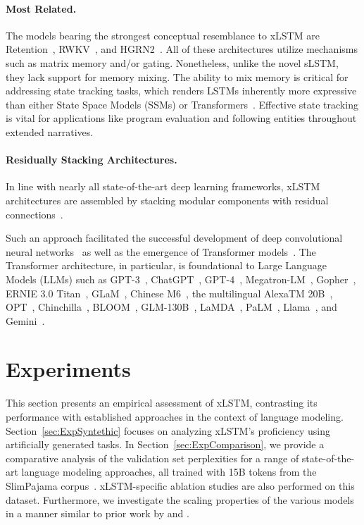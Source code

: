 \paragraph{Most Related.} The models bearing the strongest conceptual resemblance to xLSTM are Retention~\citep{Sun:23arxiv}, RWKV~\citep{Peng:23arxivshort,Peng:24arxivshort}, and HGRN2~\citep{Qin:24arxiv}. All of these architectures utilize mechanisms such as matrix memory and/or gating. Nonetheless, unlike the novel sLSTM, they lack support for memory mixing. The ability to mix memory is critical for addressing state tracking tasks, which renders LSTMs inherently more expressive than either State Space Models (SSMs) or Transformers~\citep{Merrill:24,Deletang:23}. Effective state tracking is vital for applications like program evaluation and following entities throughout extended narratives.

\paragraph{Residually Stacking Architectures.} In line with nearly all state-of-the-art deep learning frameworks, xLSTM architectures are assembled by stacking modular components with residual connections~\citep{Srivastava:15,He:16}.

Such an approach facilitated the successful development of deep convolutional neural networks~\citep{He:16} as well as the emergence of Transformer models~\citep{Vaswani:17}. The Transformer architecture, in particular, is foundational to Large Language Models (LLMs) such as GPT-3~\citep{Brown:20short}, ChatGPT~\citep{Schulman:22short}, GPT-4~\citep{Achiam:23gpt4short}, Megatron-LM~\citep{Shoeybi:19}, Gopher~\citep{Rae:21short}, ERNIE 3.0 Titan~\citep{Wang:21arxivshort}, GLaM~\citep{Du:21glamshort}, Chinese M6~\citep{Lin:21}, the multilingual AlexaTM 20B~\citep{Soltan:22}, OPT~\citep{Zhang:22opt}, Chinchilla~\citep{Hoffmann:22short}, BLOOM~\citep{Scao:22arxivshort}, GLM-130B~\citep{Zeng:22arxivshort}, LaMDA~\citep{Thoppilan:22short}, PaLM~\citep{Chowdhery:22short}, Llama~\citep{Touvron:23arxiv}, and Gemini~\citep{GeminiTeam:23arxiv,Reid:24arxiv}.

\section{Experiments}
\label{sec:Exp}

This section presents an empirical assessment of xLSTM, contrasting its performance with established approaches in the context of language modeling. Section~\ref{sec:ExpSyntethic} focuses on analyzing xLSTM's proficiency using artificially generated tasks. In Section~\ref{sec:ExpComparison}, we provide a comparative analysis of the validation set perplexities for a range of state-of-the-art language modeling approaches, all trained with 15B tokens from the SlimPajama corpus~\citep{Soboleva:23}. xLSTM-specific ablation studies are also performed on this dataset. Furthermore, we investigate the scaling properties of the various models in a manner similar to prior work by \citet{Kaplan:20} and \citet{Brown:20short}.

